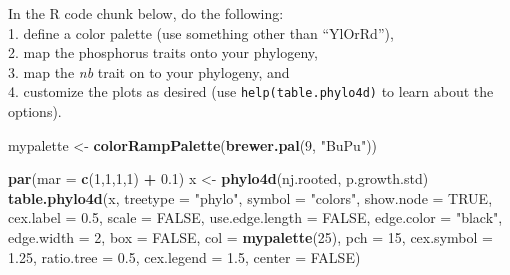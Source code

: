 \documentclass[]{article}
\newenvironment{Shaded}{\begin{snugshade}}{\end{snugshade}}
\newcommand{\KeywordTok}[1]{\textcolor[rgb]{0.13,0.29,0.53}{\textbf{#1}}}
\newcommand{\DataTypeTok}[1]{\textcolor[rgb]{0.13,0.29,0.53}{#1}}
\newcommand{\DecValTok}[1]{\textcolor[rgb]{0.00,0.00,0.81}{#1}}
\newcommand{\FloatTok}[1]{\textcolor[rgb]{0.00,0.00,0.81}{#1}}
\newcommand{\StringTok}[1]{\textcolor[rgb]{0.31,0.60,0.02}{#1}}
\newcommand{\OtherTok}[1]{\textcolor[rgb]{0.56,0.35,0.01}{#1}}
\newcommand{\OperatorTok}[1]{\textcolor[rgb]{0.81,0.36,0.00}{\textbf{#1}}}
\newcommand{\NormalTok}[1]{#1}
\begin{document}
\begin{Shaded}
\end{Shaded}

In the R code chunk below, do the following:\\
1. define a color palette (use something other than ``YlOrRd''),\\
2. map the phosphorus traits onto your phylogeny,\\
3. map the \emph{nb} trait on to your phylogeny, and\\
4. customize the plots as desired (use \texttt{help(table.phylo4d)} to
learn about the options).

\begin{Shaded}
\begin{Highlighting}[]
\NormalTok{mypalette <-}\StringTok{ }\KeywordTok{colorRampPalette}\NormalTok{(}\KeywordTok{brewer.pal}\NormalTok{(}\DecValTok{9}\NormalTok{, }\StringTok{"BuPu"}\NormalTok{))}

\KeywordTok{par}\NormalTok{(}\DataTypeTok{mar =} \KeywordTok{c}\NormalTok{(}\DecValTok{1}\NormalTok{,}\DecValTok{1}\NormalTok{,}\DecValTok{1}\NormalTok{,}\DecValTok{1}\NormalTok{) }\OperatorTok{+}\StringTok{ }\FloatTok{0.1}\NormalTok{)}
\NormalTok{x <-}\StringTok{ }\KeywordTok{phylo4d}\NormalTok{(nj.rooted, p.growth.std)}
\KeywordTok{table.phylo4d}\NormalTok{(x, }\DataTypeTok{treetype =} \StringTok{"phylo"}\NormalTok{, }\DataTypeTok{symbol =} \StringTok{"colors"}\NormalTok{, }\DataTypeTok{show.node =} \OtherTok{TRUE}\NormalTok{,}
              \DataTypeTok{cex.label =} \FloatTok{0.5}\NormalTok{, }\DataTypeTok{scale =} \OtherTok{FALSE}\NormalTok{, }\DataTypeTok{use.edge.length =} \OtherTok{FALSE}\NormalTok{,}
              \DataTypeTok{edge.color =} \StringTok{"black"}\NormalTok{, }\DataTypeTok{edge.width =} \DecValTok{2}\NormalTok{, }\DataTypeTok{box =} \OtherTok{FALSE}\NormalTok{,}
              \DataTypeTok{col =} \KeywordTok{mypalette}\NormalTok{(}\DecValTok{25}\NormalTok{), }\DataTypeTok{pch =} \DecValTok{15}\NormalTok{, }\DataTypeTok{cex.symbol =} \FloatTok{1.25}\NormalTok{,}
              \DataTypeTok{ratio.tree =} \FloatTok{0.5}\NormalTok{, }\DataTypeTok{cex.legend =} \FloatTok{1.5}\NormalTok{, }\DataTypeTok{center =} \OtherTok{FALSE}\NormalTok{)}
\end{Highlighting}
\end{Shaded}
\end{document}
